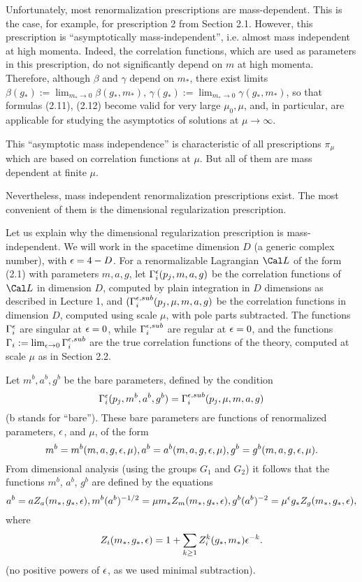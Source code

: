 Unfortunately, most renormalization prescriptions are mass-dependent. 
This is the case, for example, for prescription 2 from Section 2.1.
However, this prescription is ``asymptotically mass-independent'', 
i.e. almost mass independent at high momenta. 
Indeed, the correlation functions, which
are used as parameters in this prescription, 
do not significantly depend on $m$ at high momenta. Therefore, although
$\beta$ and $\gamma$ depend on $m_*$, there exist limits 
$\beta(g_*):=\lim_{m_*\to 0}\beta(g_*,m_*)$, 
$\gamma(g_*):=\lim_{m_*\to 0}\gamma(g_*,m_*)$, 
so that formulas (2.11), (2.12) become valid 
for very large $\mu_0,\mu$, and, in particular, are applicable
for studying the asymptotics of solutions at $\mu\to\infty$. 

This ``asymptotic mass independence'' is characteristic of all 
prescriptions $\pi_\mu$ which are based on correlation functions at
$\mu$. But all of them are mass dependent at finite $\mu$. 

Nevertheless, mass independent renormalization prescriptions exist. 
The most convenient of them is the dimensional regularization prescription. 

Let us explain why the dimensional regularization prescription 
is mass-independent. We will work in the spacetime dimension $D$
(a generic complex number), with $\epsilon=4-D$. 
For a renormalizable Lagrangian $\Cal L$ of the form (2.1) 
with parameters $m,a,g$,  let 
$\Gamma_i^\epsilon(p_j,m,a,g)$
be the correlation functions of $\Cal L$ in dimension $D$,
computed by plain integration in $D$ dimensions as described in Lecture 1, and
$(\Gamma_i^{\epsilon,sub}(p_j,\mu,m,a,g)$ be the correlation functions 
in dimension $D$, computed using scale $\mu$, with pole parts subtracted.
 The functions $\Gamma_i^\epsilon$ are singular at $\epsilon=0$, 
while $\Gamma_i^{\epsilon,sub}$ are regular at $\epsilon=0$, and the
functions $\Gamma_i:=\lim_{\epsilon\to 0}\Gamma_i^{\epsilon,sub}$  
are the true correlation functions of the theory, computed at scale $\mu$
as in Section 2.2. 
 
Let $m^b,a^b,g^b$ be the bare parameters, 
defined by the condition
$$
\Gamma_i^\epsilon(p_j,m^b,a^b,g^b)=\Gamma_i^{\epsilon,sub}(p_j,\mu,m,a,g)
$$
(b stands for ``bare''). These bare parameters are functions of
renormalized parameters, $\epsilon$, and $\mu$, of the form
$$
m^b=m^b(m,a,g,\epsilon,\mu),
a^b=a^b(m,a,g,\epsilon,\mu),
g^b=g^b(m,a,g,\epsilon,\mu).
$$
{}From dimensional analysis (using the groups $G_1$ and $G_2$)
it follows that the functions
$m^b$, $a^b$, $g^b$ are defined by the equations
$$
a^b=aZ_a(m_*,g_*,\epsilon), m^b(a^b)^{-1/2}=
\mu m_*Z_m(m_*,g_*,\epsilon), g^b(a^b)^{-2}=\mu^\epsilon
g_*Z_g(m_*,g_*,\epsilon), 
$$
where 
$$
Z_i(m_*,g_*,\epsilon)=1+\sum_{k\ge 1}Z_i^k(g_*,m_*)\epsilon^{-k}.
$$
(no positive powers of $\epsilon$, as we used minimal subtraction).
 
